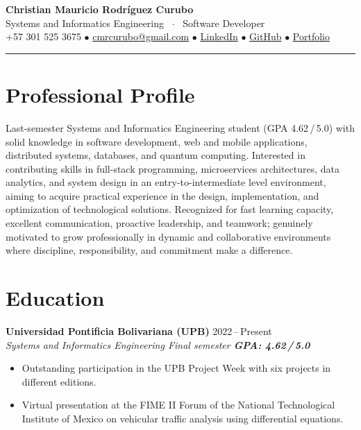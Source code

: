 \documentclass[10pt, letterpaper]{article}
\newcommand{\entryhead}[4]{%
    \noindent
    {\bfseries\color{darkgray}#1} \quad {\small\color{lightaccent}#2} \hfill \textcolor{midgray}{\small #4}\\[1pt]
    {\small\itshape\color{midgray}#3}\par
    \vspace{2pt}%
}
\begin{document}

\begin{center}
    {\Huge\bfseries\color{darkgray} Christian Mauricio Rodr\'iguez Curubo}\\[4pt]
    {\large\color{lightaccent} Systems and Informatics Engineering \ $\cdot$ \ Software Developer}\\[5pt]
    \color{midgray}\small
    +57 301 525 3675 \quad
    $\bullet$ \quad \href{mailto:cmrcurubo@gmail.com}{cmrcurubo@gmail.com} \quad
    $\bullet$ \quad \href{https://www.linkedin.com/in/christian-mauricio-rodriguez-curubo-75501a2a6/}{LinkedIn} \quad
    $\bullet$ \quad \href{https://github.com/ChisCurubo}{GitHub} \quad
    $\bullet$ \quad \href{https://chiscurubo.github.io/portfolio-dev/en/}{Portfolio}
\end{center}
{\color{lightgray}\hrule}
\vspace{2pt}

\section{Professional Profile}

\color{darkgray}
Last-semester Systems and Informatics Engineering student (GPA 4.62\,/\,5.0) with solid knowledge in software development, web and mobile applications, distributed systems, databases, and quantum computing. Interested in contributing skills in full-stack programming, microservices architectures, data analytics, and system design in an entry-to-intermediate level environment, aiming to acquire practical experience in the design, implementation, and optimization of technological solutions. Recognized for fast learning capacity, excellent communication, proactive leadership, and teamwork; genuinely motivated to grow professionally in dynamic and collaborative environments where discipline, responsibility, and commitment make a difference.
\color{black}

\section{Education}

\entryhead{Universidad Pontificia Bolivariana (UPB)}{Bucaramanga, Colombia}%
{Systems and Informatics Engineering \textemdash{} Final semester \quad \textbf{\color{accent}GPA: 4.62\,/\,5.0}}{2022\,--\,Present}
\begin{itemize}\small
    \item Outstanding participation in the UPB Project Week with six projects in different editions.
    \item Virtual presentation at the FIME II Forum of the National Technological Institute of Mexico on vehicular traffic analysis using differential equations.
\end{itemize}
\end{document}
